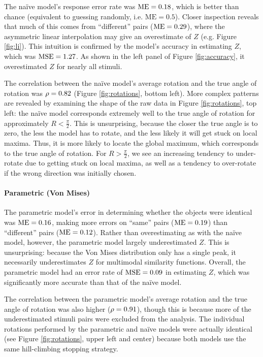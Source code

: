 \documentclass{article} %
\newcommand{\ME}[0]{\mathrm{ME}}
\newcommand{\naive}[0]{na\"ive}
\begin{document}
The \naive{} model's response error rate was $\NaiveME{}$, which is
better than chance (equivalent to guessing randomly,
i.e. $\ME{}=0.5$). Closer inspection reveals that much of this comes
from ``different'' pairs ($\NaiveMEdiff{}$), where the asymmetric
linear interpolation may give an overestimate of $Z$ (e.g. Figure
\ref{fig:li}).  This intuition is confirmed by the model's accuracy in
estimating $Z$, which was $\mathrm{MSE}{}=1.27{}$. As shown in the left panel of
Figure \ref{fig:accuracy}, it overestimated $Z$ for nearly all
stimuli.

The correlation between the \naive{} model's average rotation and the
true angle of rotation was $\rho=0.82{}$ (Figure \ref{fig:rotations},
bottom left). More complex patterns are revealed by examining the
shape of the raw data in Figure \ref{fig:rotations}, top left: the
\naive{} model corresponds extremely well to the true angle of
rotation for approximately $R<\frac{\pi}{2}$. This is unsurprising,
because the closer the true angle is to zero, the less the model has
to rotate, and the less likely it will get stuck on local
maxima. Thus, it is more likely to locate the global maximum, which
corresponds to the true angle of rotation. For $R>\frac{\pi}{2}$, we
see an increasing tendency to under-rotate due to getting stuck on
local maxima, as well as a tendency to over-rotate if the wrong
direction was initially chosen.


\paragraph{Parametric (Von Mises)}

The parametric model's error in determining whether the objects were
identical was $\VMME{}$, making more errors on ``same'' pairs
($\VMMEsame{}$) than ``different'' pairs ($\VMMEdiff{}$). Rather than
overestimating as with the \naive{} model, however, the parametric
model largely underestimated $Z$. This is unsurprising: because the
Von Mises distribution only has a single peak, it necessarily
underestimates $Z$ for multimodal similarity functions. Overall, the
parametric model had an error rate of $\mathrm{MSE}{}=0.09{}$ in estimating $Z$,
which was significantly more accurate than that of the \naive{} model.

The correlation between the parametric model's average rotation and
the true angle of rotation was also higher ($\rho=0.91{}$), though this
is because more of the underestimated stimuli pairs were excluded from
the analysis. The individual rotations performed by the parametric and
\naive{} models were actually identical (see Figure
\ref{fig:rotations}, upper left and center) because both models use
the same hill-climbing stopping strategy.
\end{document}
